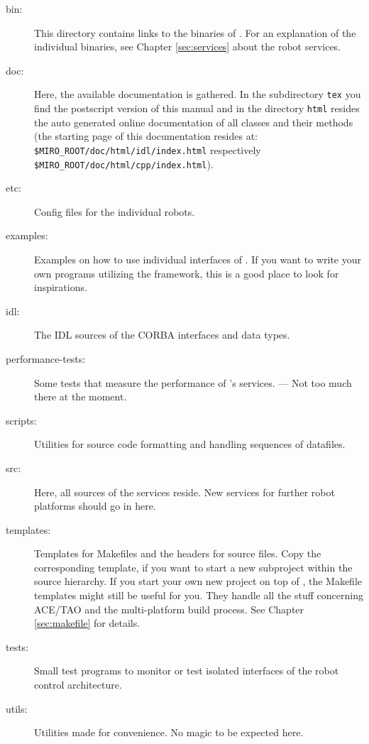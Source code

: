 \documentclass[10pt]{book}
\begin{document}
\begin{description}
\item[bin:]
  This directory contains links to the binaries of \miro.
  For an explanation of the individual binaries, see Chapter
  \ref{sec:services} about the robot services.
\item[doc:]
  Here, the available documentation is gathered. In the
  subdirectory {\tt tex} you find the postscript version of this
  manual and in the directory {\tt html} resides the auto generated
  online documentation of all \miro classes and their methods
  (the starting page of this documentation resides at: \\
  {\tt \$MIRO\_ROOT/doc/html/idl/index.html} respectively \\
  {\tt \$MIRO\_ROOT/doc/html/cpp/index.html}).
\item[etc:]
  Config files for the individual robots.
\item[examples:]
  Examples on how to use individual interfaces of \miro. If you want
  to write your own programs utilizing the \miro framework, this is a
  good place to look for inspirations.
\item[idl:]
  The IDL sources of the CORBA interfaces and data types.
\item[performance-tests:]
  Some tests that measure the performance of \miro's
  services. --- Not too much there at the moment.
\item[scripts:]
  Utilities for source code formatting and handling sequences of
  datafiles.
\item[src:]
  Here, all sources of the \miro services reside. New services for
  further robot platforms should go in here.
\item[templates:]
  Templates for Makefiles and the headers for source files. Copy the
  corresponding template, if you want to start a new subproject within
  the \miro source hierarchy. If you start your own new project on top
  of \miro, the Makefile templates might still be useful for you. They
  handle all the stuff concerning ACE/TAO and the multi-platform build
  process. See Chapter \ref{sec:makefile} for details.
\item[tests:]
  Small test programs to monitor or test isolated interfaces of the
  \miro robot control architecture.
\item[utils:]
  Utilities made for convenience. No magic to be expected here.
\end{description}















\printindex
\end{document}
